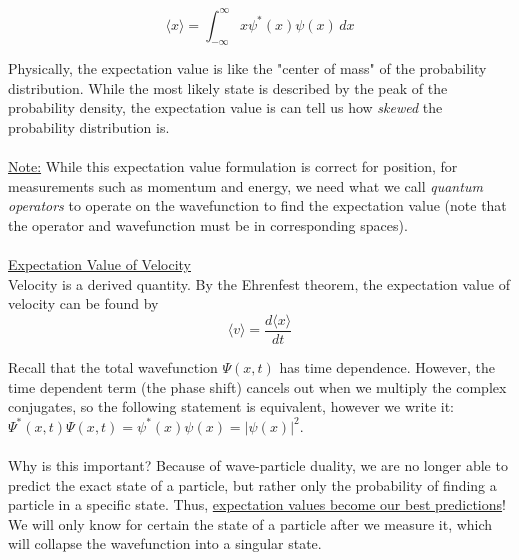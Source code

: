 \documentclass[12pt]{article}
\begin{document}
\begin{itemize}
\begin{itemize}
        \[\langle x \rangle = \int_{-\infty}^{\infty} x \psi^*(x)\psi(x)\, dx\]
    \end{itemize}
    Physically, the expectation value is like the "center of mass" of the probability distribution. While the most likely state is described by the peak of the probability density, the expectation value is can tell us how \textit{skewed} the probability distribution is.\\\\
    \underline{Note:} While this expectation value formulation is correct for position, for measurements such as momentum and energy, we need what we call \textit{quantum operators} to operate on the wavefunction to find the expectation value (note that the operator and wavefunction must be in corresponding spaces).\\\\
    \underline{Expectation Value of Velocity}\\
    Velocity is a derived quantity. By the Ehrenfest theorem, the expectation value of velocity can be found by
    \[\langle v \rangle = \frac{d\langle x \rangle}{dt} \]
\end{itemize}
Recall that the total wavefunction $\Psi(x,t)$ has time dependence. However, the time dependent term (the phase shift) cancels out when we multiply the complex conjugates, so the following statement is equivalent, however we write it: $\Psi^*(x,t)\Psi(x,t) =\psi^*(x)\psi(x) =|\psi(x)|^2$.\\\\
Why is this important? Because of wave-particle duality, we are no longer able to predict the exact state of a particle, but rather only the probability of finding a particle in a specific state. Thus, \underline{expectation values become our best predictions}! We will only know for certain the state of a particle after we measure it, which will collapse the wavefunction into a singular state.
\end{document}
